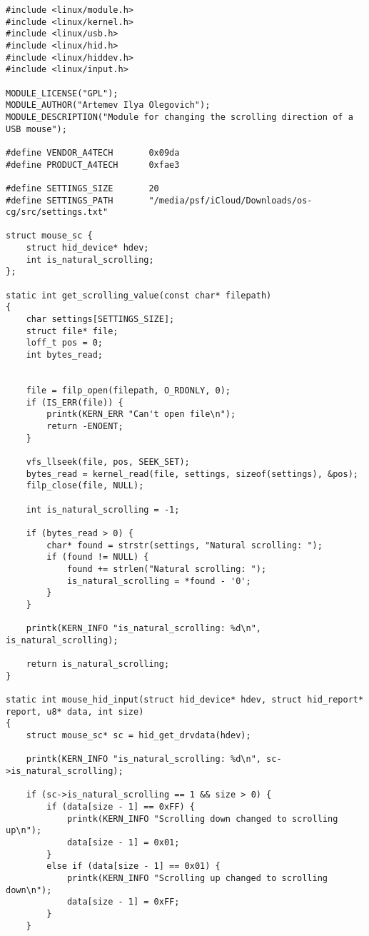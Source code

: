 \documentclass{bmstu}
\begin{document}
\begin{lstlisting}[caption={Загружаемый модуль ядра реализующий драйвер мыши}, label=lst:prill]
#include <linux/module.h>
#include <linux/kernel.h>
#include <linux/usb.h>
#include <linux/hid.h>
#include <linux/hiddev.h>
#include <linux/input.h>

MODULE_LICENSE("GPL");
MODULE_AUTHOR("Artemev Ilya Olegovich");
MODULE_DESCRIPTION("Module for changing the scrolling direction of a USB mouse");

#define VENDOR_A4TECH       0x09da
#define PRODUCT_A4TECH      0xfae3

#define SETTINGS_SIZE       20
#define SETTINGS_PATH       "/media/psf/iCloud/Downloads/os-cg/src/settings.txt"

struct mouse_sc {
    struct hid_device* hdev;
    int is_natural_scrolling;
};

static int get_scrolling_value(const char* filepath)
{
    char settings[SETTINGS_SIZE];
    struct file* file;
    loff_t pos = 0;
    int bytes_read;


    file = filp_open(filepath, O_RDONLY, 0);
    if (IS_ERR(file)) {
        printk(KERN_ERR "Can't open file\n");
        return -ENOENT;
    }

    vfs_llseek(file, pos, SEEK_SET);
    bytes_read = kernel_read(file, settings, sizeof(settings), &pos);
    filp_close(file, NULL);

    int is_natural_scrolling = -1;

    if (bytes_read > 0) {
        char* found = strstr(settings, "Natural scrolling: ");
        if (found != NULL) {
            found += strlen("Natural scrolling: ");
            is_natural_scrolling = *found - '0';
        }
    }

    printk(KERN_INFO "is_natural_scrolling: %d\n", is_natural_scrolling);

    return is_natural_scrolling;
}

static int mouse_hid_input(struct hid_device* hdev, struct hid_report* report, u8* data, int size)
{
    struct mouse_sc* sc = hid_get_drvdata(hdev);

    printk(KERN_INFO "is_natural_scrolling: %d\n", sc->is_natural_scrolling);

    if (sc->is_natural_scrolling == 1 && size > 0) {
        if (data[size - 1] == 0xFF) {
            printk(KERN_INFO "Scrolling down changed to scrolling up\n");
            data[size - 1] = 0x01;
        }
        else if (data[size - 1] == 0x01) {
            printk(KERN_INFO "Scrolling up changed to scrolling down\n");
            data[size - 1] = 0xFF;
        }
    }


\end{lstlisting}
\end{document}
